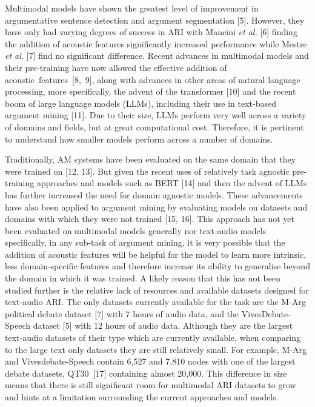 \documentclass[twocolumn]{article}
\begin{document}
Multimodal models have shown the greatest level of improvement in
argumentative sentence detection and argument segmentation {[}5{]}.
However, they have only had varying degrees of success in ARI with
Mancini \emph{et al.} {[}6{]} finding the addition of acoustic features
significantly increased performance while Mestre \emph{et al.} {[}7{]}
find no significant difference. Recent advances in multimodal models and
their pre-training have now allowed the effective addition of \mbox{acoustic
features {[}8, 9{]}}, along with advances in other areas of natural
language processing, more specifically, the advent of the transformer
{[}10{]} and the recent boom of large language models (LLMs), including
their use in text-based argument mining {[}11{]}. Due to their size,
LLMs perform very well across a variety of domains and fields, but at
great computational cost. Therefore, it is pertinent to understand how
smaller models perform across a number of domains.

Traditionally, AM systems have been evaluated on the same domain that
they were trained on {[}12, 13{]}. But given the recent uses of
relatively task agnostic pre-training approaches and models such as BERT
{[}14{]} and then the advent of LLMs has further increased the need for
domain agnostic models. These advancements have also been applied to
argument mining by evaluating models on datasets and domains with which
they were not trained {[}15, 16{]}. This approach has not yet been
evaluated on multimodal models generally nor text-audio models
specifically, in any sub-task of argument mining, it is very possible
that the addition of acoustic features will be helpful for the model to
learn more intrinsic, less domain-specific features and therefore
increase its ability to generalise beyond the domain in which it was
trained. A likely reason that this has not been studied further is the
relative lack of resources and available datasets designed for
text-audio ARI. The only datasets currently available for the task are
the M-Arg political debate dataset {[}7{]} with 7 hours of audio data,
and the VivesDebate-Speech dataset {[}5{]} with 12 hours of audio data.
Although they are the largest text-audio datasets of their type which
are currently available, when comparing to the large text only datasets
they are still relatively small. For example, M-Arg and
Vivesdebate-Speech contain 6,527 and 7,810 nodes with one of the largest
debate datasets, \mbox{QT30 {[}17{]}} containing almost 20,000. This difference
in size means that there is still significant room for multimodal ARI
datasets to grow and hints at a limitation surrounding the current
approaches and models.
\end{document}
